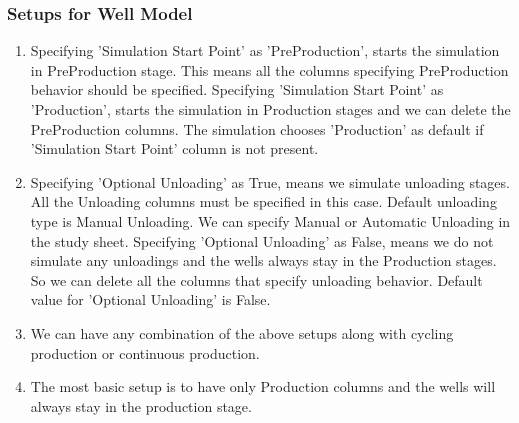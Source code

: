 \subsubsection{Setups for Well Model}
\begin{enumerate}
	\item[Setup 1:] Specifying 'Simulation Start Point' as 'PreProduction', starts the simulation in PreProduction stage. This means all the columns specifying PreProduction behavior should be specified. Specifying 'Simulation Start Point' as 'Production', starts the simulation in Production stages and we can delete the PreProduction columns. The simulation chooses 'Production' as default if 'Simulation Start Point' column is not present.
	\item[Setup 2:] Specifying 'Optional Unloading' as True, means we simulate unloading stages. All the Unloading columns must be specified in this case. Default unloading type is Manual Unloading. We can specify Manual or Automatic Unloading in the study sheet. Specifying 'Optional Unloading' as False, means we do not simulate any unloadings and the wells always stay in the Production stages. So we can delete all the columns that specify unloading behavior. Default value for 'Optional Unloading' is False.
	\item[Setup 3:] We can have any combination of the above setups along with cycling production or continuous production. 
	\item[Setup 4:] The most basic setup is to have only Production columns and the wells will always stay in the production stage.
\end{enumerate}
